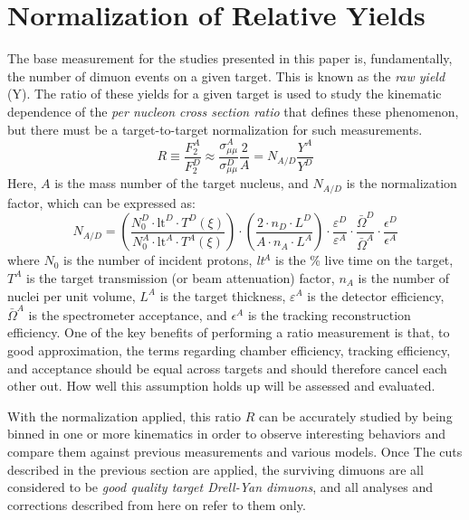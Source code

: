 \section{Normalization of Relative Yields}

The base measurement for the studies presented in this paper is, fundamentally, the number of dimuon events on a given target. This is known as the \emph{raw yield} (Y). The ratio of these yields for a given target is used to study the kinematic dependence of the \emph{per nucleon cross section ratio} that defines these phenomenon, but there must be a target-to-target normalization for such measurements.
\begin{equation}
R \equiv \frac{F_2^A}{F_2^D} \approx \frac{\sigma_{\mu\mu}^A}{\sigma_{\mu\mu}^D} \frac{2}{A} = N_{A/D} \frac{Y^A}{Y^D}
\end{equation}
Here, $A$ is the mass number of the target nucleus, and $N_{A/D}$ is the normalization factor, which can be expressed as:
\begin{equation}
	N_{A/D} =
		\left(\frac{ N_0^D \cdot \text{lt}^D \cdot T^D(\xi)}{N_0^A \cdot \text{lt}^A \cdot T^A(\xi) } \right) \cdot 
		\left( \frac{ 2 \cdot n_D \cdot L^D }{ A \cdot n_A \cdot L^A } \right) \cdot 
		\frac{ \varepsilon^D }{ \varepsilon^A }  \cdot 
		\frac{ \bar{\Omega}^D }{\bar{ \Omega}^A } \cdot 
		\frac{ \epsilon^D }{ \epsilon^A }
\end{equation}
where $N_0$ is the number of incident protons, \emph{lt}$^A$ is the \% live time on the target, $T^A$ is the target transmission (or beam attenuation) factor, $n_A$ is the number of nuclei per unit volume, $L^A$ is the target thickness, $\varepsilon^A$ is the detector efficiency, $\bar{\Omega}^A$ is the spectrometer acceptance, and $\epsilon^A$ is the tracking reconstruction efficiency. One of the key benefits of performing a ratio measurement is that, to good approximation, the terms regarding chamber efficiency, tracking efficiency, and acceptance should be equal across targets and should therefore cancel each other out. How well this assumption holds up will be assessed and evaluated.

With the normalization applied, this ratio $R$ can be accurately studied by being binned in one or more kinematics in order to observe interesting behaviors and compare them against previous measurements and various models. Once The cuts described in the previous section are applied, the surviving dimuons are all considered to be \emph{good quality target Drell-Yan dimuons}, and all analyses and corrections described from here on refer to them only.

